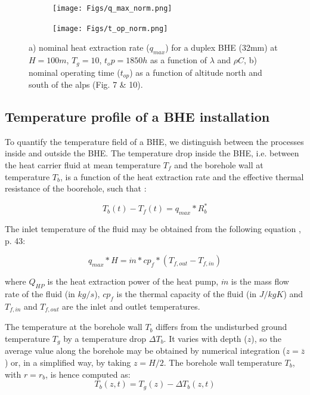 \begin{figure}[b]
\centering
\begin{subfigure}{.48\textwidth}
  \centering
  \texttt{[image: Figs/q\_max\_norm.png]}  
\end{subfigure}
\begin{subfigure}{.48\textwidth}
  \centering
  \texttt{[image: Figs/t\_op\_norm.png]}  
\end{subfigure}
\caption{a) nominal heat extraction rate ($q_{max}$) for a duplex BHE (32mm) at $H=100m$, $T_g=10$, $t_op = 1850h$ as a function of $\lambda$ and $\rho C$, b) nominal operating time ($t_{op}$) as a function of altitude north and south of the alps \citep{sia_sondes_2010} (Fig. 7 \& 10).}
\label{fig:t_q_norm}
\end{figure}

\subsection{Temperature profile of a BHE installation}
\label{model_intro}

To quantify the temperature field of a BHE, we distinguish between the processes inside and outside the BHE. The temperature drop inside the BHE, i.e. between the heat carrier fluid at mean temperature $T_f$ and the borehole wall at temperature $T_b$, is a function of the heat extraction rate and the effective thermal resistance of the boorehole, such that \citep{claesson_conductive_1988}:

\begin{equation}
\label{eq:T_b}
    T_b(t) - T_f(t) = q_{max}*R_b^*
\end{equation}

The inlet temperature of the fluid may be obtained from the following equation \citep{pahud_geothermal_2002}, p. 43:

\begin{equation}
    q_{max} * H = \dot{m} * cp_f * (T_{f, out} - T_{f, in})
\end{equation}

where $Q_{HP}$ is the heat extraction power of the heat pump, $\dot{m}$ is the mass flow rate of the fluid (in $kg/s$), $cp_{f}$ is the thermal capacity of the fluid (in $J/kgK$) and $T_{f,in}$ and $T_{f,out}$ are the inlet and outlet temperatures.

The temperature at the borehole wall $T_b$ differs from the undisturbed ground temperature $T_g$ by a temperature drop $\Delta T_b$. It varies with depth ($z$), so the average value along the borehole may be obtained by numerical integration ($z = \overline{z}$) or, in a simplified way, by taking $z = H/2$. The borehole wall temperature $T_b$, with $r = r_b$, is hence computed as:
\begin{equation}
    T_b(z, t) = T_g(z) - \Delta T_b(z, t)
\end{equation}

